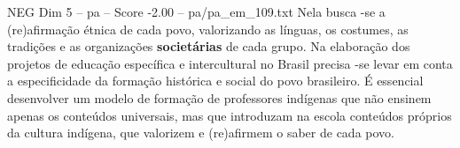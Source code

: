 \begin{textsample}{NEG Dim 5 – pa – Score -2.00 – pa/pa\_em\_109.txt}
Nela busca -se a (re)afirmação étnica de cada povo, valorizando as línguas, os costumes, as tradições e as organizações \textbf{societárias} de cada grupo.
Na elaboração dos projetos de educação específica e intercultural no Brasil precisa -se levar em conta a especificidade da formação histórica e social do povo brasileiro.
É essencial desenvolver um modelo de formação de professores indígenas que não ensinem apenas os conteúdos universais, mas que introduzam na escola conteúdos próprios da cultura indígena, que valorizem e (re)afirmem o saber de cada povo.

\end{textsample}
